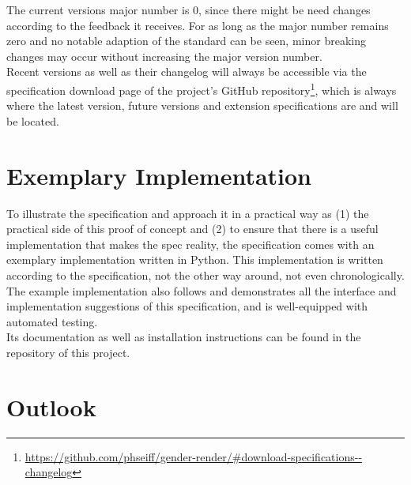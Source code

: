 \documentclass{article}
\begin{document}
    The current versions major number is 0, since there might be need changes according to the feedback it receives.
    For as long as the major number remains zero and no notable adaption of the standard can be seen, minor breaking changes may occur without increasing the major version number.\\

    Recent versions as well as their changelog will always be accessible via the specification download page of the project's GitHub repository\footnote{\url{https://github.com/phseiff/gender-render/\#download-specifications--changelog}}, which is always where the latest version, future versions and extension specifications are and will be located.\\

\section{Exemplary Implementation}

    To illustrate the specification and approach it in a practical way as (1) the practical side of this proof of concept and (2) to ensure that there is a useful implementation that makes the spec reality, the specification comes with an exemplary implementation written in Python.
    This implementation is written according to the specification, not the other way around, not even chronologically.
    The example implementation also follows and demonstrates all the interface and implementation suggestions of this specification, and is well-equipped with automated testing.\\

    Its documentation as well as installation instructions can be found in the repository of this project.\\

\section{Outlook}
\end{document}
